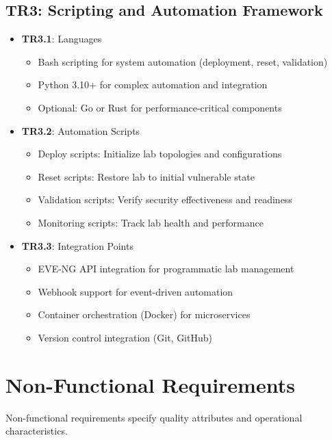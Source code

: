 \subsection{TR3: Scripting and Automation Framework}

\begin{itemize}

\item \textbf{TR3.1}: Languages
\begin{itemize}
\item Bash scripting for system automation (deployment, reset, validation)
\item Python 3.10+ for complex automation and integration
\item Optional: Go or Rust for performance-critical components
\end{itemize}

\item \textbf{TR3.2}: Automation Scripts
\begin{itemize}
\item Deploy scripts: Initialize lab topologies and configurations
\item Reset scripts: Restore lab to initial vulnerable state
\item Validation scripts: Verify security effectiveness and readiness
\item Monitoring scripts: Track lab health and performance
\end{itemize}

\item \textbf{TR3.3}: Integration Points
\begin{itemize}
\item EVE-NG API integration for programmatic lab management
\item Webhook support for event-driven automation
\item Container orchestration (Docker) for microservices
\item Version control integration (Git, GitHub)
\end{itemize}

\end{itemize}

\section{Non-Functional Requirements}

Non-functional requirements specify quality attributes and operational characteristics.

